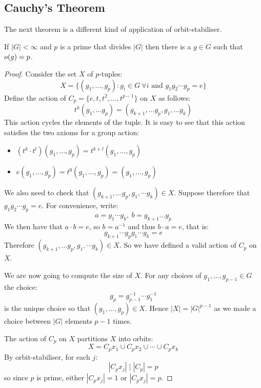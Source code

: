 \documentclass[../main.tex]{subfiles}
\begin{document}
\subsection{Cauchy's Theorem}
The next theorem is a different kind of application of orbit-stabiliser.
\begin{theorem}
  If $|G| < \infty$ and $p$ is a prime that divides $|G|$ then there is a $g \in G$ such that $o(g) = p$. \label{cauchysTheorem}
\end{theorem}
\begin{proof}
  Consider the set $X$ of $p$-tuples:
  \[
    X = \{(g_1, \ldots, g_p) : g_i \in G\ \forall i \text{ and } g_1 g_2 \cdots g_p = e\}
  \]
  Define the action of $C_p = \{e, t, t^2, \ldots, t^{p-1}\}$ on $X$ as follows:
  \[
    t^{k}(g_1, \ldots g_p) = (g_{k + 1}, \ldots g_p, g_1, \ldots g_k)
  \]
  This action cycles the elements of the tuple.
  It is easy to see that this action satisfies the two axioms for a group action:
  \begin{itemize}
    \item  $(t^{k} \cdot t^{l})(g_1, \ldots, g_p) = t^{k +l}(g_1, \ldots, g_p)$
    \item $e(g_1, \ldots, g_p) = t^0(g_1, \ldots, g_p) = (g_1, \ldots, g_p)$
  \end{itemize}
  We also need to check that $(g_{k + 1}, \ldots g_p, g_1, \cdots g_k) \in X$.
  Suppose therefore that $g_1 g_2 \cdots g_p = e$.
  For convenience, write:
  \[
    a = g_1 \cdots g_k,\ b = g_{k + 1} \ldots g_p
  \]
  We then have that $a \cdot b = e$, so $b = a^{-1}$ and thus $b \cdot a = e$, that is:
  \[
    g_{k + 1} \cdots g_p g_1 \cdots g_k = e
  \]
  Therefore $(g_{k + 1}, \ldots g_p, g_1, \cdots g_k) \in X$.
  So we have defined a valid action of $C_p$ on $X$.

  We are now going to compute the size of $X$.
  For any choices of $g_1, \ldots, g_{p-1} \in G$ the choice:
  \[
    g_p = g^{-1}_{p-1} \cdots g^{-1}_{1}
  \]
  is the unique choice so that $(g_1, \ldots, g_p) \in X$.
  Hence $|X| = |G|^{p-1}$ as we made a choice between $|G|$ elements $p - 1$ times.

  The action of $C_p$ on $X$ partitions $X$ into orbits:
  \[
    X = C_p x_1 \cup C_p x_2 \cup \cdots \cup C_p x_k
  \]
  By orbit-stabiliser, for each $j$:
  \[
    |C_p x_j| \mid |C_p| = p
  \]
  so since $p$ is prime, either $|C_p x_j| = 1$ or $|C_p x_j| = p$.


\end{proof}
\end{document}
